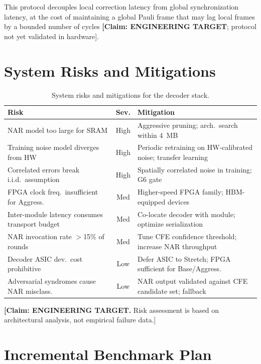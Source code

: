 \documentclass[conference]{IEEEtran}
\begin{document}
This protocol decouples local correction latency from global synchronization latency, at the cost of maintaining a global Pauli frame that may lag local frames by a bounded number of cycles \textbf{[Claim: ENGINEERING TARGET}; protocol not yet validated in hardware].

\section{System Risks and Mitigations}

\begin{table}[H]
\centering
\caption{System risks and mitigations for the decoder stack.}
\label{tab:risks}
\footnotesize
\begin{tabularx}{\columnwidth}{L{2.5cm}cL{3.5cm}}
\toprule
\textbf{Risk} & \textbf{Sev.} & \textbf{Mitigation} \\
\midrule
NAR model too large for SRAM & High & Aggressive pruning; arch.\ search within 4~MB \\
Training noise model diverges from HW & High & Periodic retraining on HW-calibrated noise; transfer learning \\
Correlated errors break i.i.d.\ assumption & High & Spatially correlated noise in training; G6 gate \\
FPGA clock freq.\ insufficient for Aggress. & Med & Higher-speed FPGA family; HBM-equipped devices \\
Inter-module latency consumes transport budget & Med & Co-locate decoder with module; optimize serialization \\
NAR invocation rate $>$15\% of rounds & Med & Tune CFE confidence threshold; increase NAR throughput \\
Decoder ASIC dev.\ cost prohibitive & Low & Defer ASIC to Stretch; FPGA sufficient for Base/Aggress. \\
Adversarial syndromes cause NAR misclass. & Low & NAR output validated against CFE candidate set; fallback \\
\bottomrule
\end{tabularx}
\end{table}

\textbf{[Claim: ENGINEERING TARGET.} Risk assessment is based on architectural analysis, not empirical failure data.]

\section{Incremental Benchmark Plan}
\end{document}
